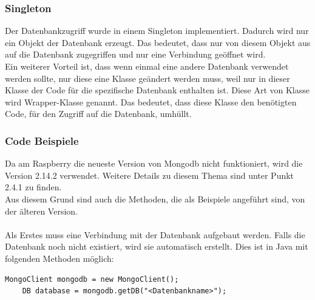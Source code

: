 \subsubsection{Singleton}
Der Datenbankzugriff wurde in einem Singleton implementiert. Dadurch wird nur ein Objekt der Datenbank erzeugt. Das bedeutet, dass nur von diesem Objekt aus auf die Datenbank zugegriffen und nur eine Verbindung geöffnet wird.
\\ Ein weiterer Vorteil ist, dass wenn einmal eine andere Datenbank verwendet werden sollte, nur diese eine Klasse geändert werden muss, weil nur in dieser Klasse der Code für die spezifische Datenbank enthalten ist. Diese Art von Klasse wird Wrapper-Klasse genannt. Das bedeutet, dass diese Klasse den benötigten Code, für den Zugriff auf die Datenbank, umhüllt.

\subsubsection{Code Beispiele}
Da am Raspberry die neueste Version von Mongodb nicht funktioniert, wird die Version 2.14.2 verwendet. Weitere Details zu diesem Thema sind unter Punkt 2.4.1 zu finden.
\\ Aus diesem Grund sind auch die Methoden, die als Beispiele angeführt sind, von der älteren Version. 
\\ \\ 
Als Erstes muss eine Verbindung mit der Datenbank aufgebaut werden. Falls die Datenbank noch nicht existiert, wird sie automatisch erstellt.
Dies ist in Java mit folgenden Methoden möglich:
\begin{lstlisting}[style=JavaStyle, caption=Mit Mongodb verbinden]
	MongoClient mongodb = new MongoClient();
	DB database = mongodb.getDB("<Datenbankname>");
\end{lstlisting}

